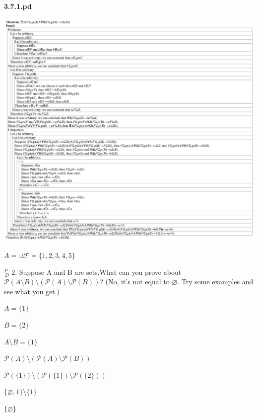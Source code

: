 \documentclass{article}
\begin{document}
\vspace{30pt}

\textbf{3.7.1.pd}
\vspace{10pt}

\includegraphics[width=\textwidth,height=\textheight,keepaspectratio]{3_7_1}

\vspace{30pt}

$A = \cup \mathcal{F} = \{1,2,3,4,5\}$

\vspace{30pt}

$^{\textit{P}}_{\, \textit{D}}$ 2. Suppose A and B are sets.What can you prove about $\mathcal{P} (A \setminus B) \setminus (\mathcal{P} (A) \setminus \mathcal{P} (B))$? (No, it's not equal to $\varnothing$. Try some examples and see what you get.)


\vspace{30pt}

$A = \{1\}$

$B = \{2\}$

$A \setminus B = \{1\}$

$\mathcal{P}(A) \setminus (\mathcal{P}(A) \setminus \mathcal{P}(B))$

$\mathcal{P}(\{1\}) \setminus (\mathcal{P}(\{1\}) \setminus \mathcal{P}(\{2\}))$

$\{\varnothing,1\} \setminus \{1\}$

$\{\varnothing\}$
\end{document}
